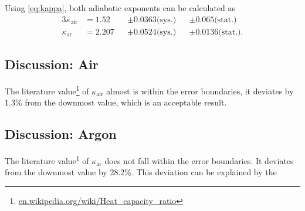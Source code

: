 Using \autoref{eq:kappa}, both adiabatic exponents can be calculated as
\begin{alignat*}{3}
	\kappa_\text{air}&=\num{1.52}&&\pm\num{0.0363}\text{(sys.)}&&\pm\num{0.065}\text{(stat.)} \\
	\kappa_\text{ar}&=\num{2.207}&&\pm\num{0.0524}\text{(sys.)}&&\pm\num{0.0136}\text{(stat.)}.
\end{alignat*}

\subsection{Discussion: Air}
The literature value\footnote{\url{en.wikipedia.org/wiki/Heat_capacity_ratio}} of $\kappa_\text{air}$ almost is within the error boundaries, it deviates by \num{1.3}\% from the downmost value, which is an acceptable result.

\subsection{Discussion: Argon}
The literature value\textsuperscript{1} of $\kappa_\text{ar}$ does not fall within the error boundaries.
It deviates from the downmost value by \num{28.2}\%.
This deviation can be explained by the 
